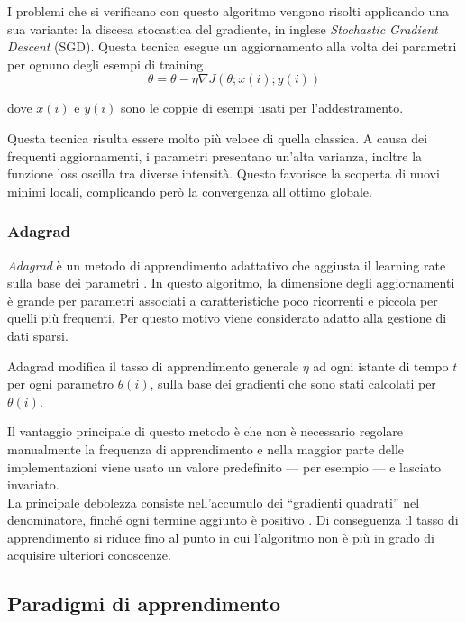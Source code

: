 I problemi che si verificano con questo algoritmo vengono risolti applicando una sua variante: la {discesa stocastica del gradiente}, in inglese \emph{Stochastic Gradient Descent} (SGD).
Questa tecnica esegue un aggiornamento alla volta dei parametri per ognuno degli esempi di training
\begin{equation}
\theta = \theta - \eta \nabla J(\theta; x(i); y(i))
\end{equation}

dove $x(i)$ e $y(i)$ sono le coppie di esempi usati per l'addestramento.

Questa tecnica risulta essere molto più veloce di quella classica. 
A causa dei frequenti aggiornamenti, i parametri presentano un'alta varianza, inoltre la funzione loss oscilla tra diverse intensità. Questo favorisce la scoperta di nuovi minimi locali, complicando però la convergenza all'ottimo globale. 


\subsubsection{Adagrad}
\label{subsubsec:adagrad}

\emph{Adagrad} è un metodo di apprendimento adattativo che aggiusta il learning rate sulla base dei parametri \cite{duchi2011adaptive} .
In questo algoritmo, la dimensione degli aggiornamenti è grande per parametri associati a caratteristiche poco ricorrenti e piccola per quelli più frequenti. Per questo motivo viene considerato adatto alla gestione di dati sparsi.

Adagrad modifica il tasso di apprendimento generale $\eta$ ad ogni istante di tempo $t$ per ogni parametro $\theta(i)$, sulla base dei gradienti che sono stati calcolati per $\theta(i)$.

Il vantaggio principale di questo metodo è che non è necessario regolare manualmente la frequenza di apprendimento e nella maggior parte delle implementazioni viene usato un valore predefinito --- per esempio  --- e lasciato invariato.\\
La principale debolezza consiste nell'accumulo dei ``gradienti quadrati'' nel denominatore, finché ogni termine aggiunto è positivo \cite{ruder2016overview}. Di conseguenza il tasso di apprendimento si riduce fino al punto in cui l'algoritmo non è più in grado di acquisire ulteriori conoscenze. 

\subsection{Paradigmi di apprendimento}
\label{subsec:Paradigmi di apprendimento}

